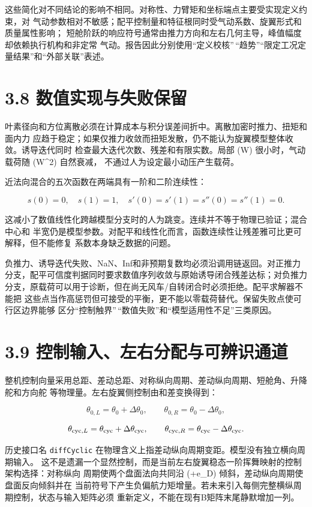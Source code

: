 \documentclass[UTF8,11pt,oneside,openany,fontset=windows]{ctexbook}
\begin{document}
这些简化对不同结论的影响不相同。对称性、力臂矩和坐标端点主要受实现定义约束，对
气动参数相对不敏感；配平控制量和特征根同时受气动系数、旋翼形式和质量属性影响；
短舱阶跃的响应符号通常由推力方向和左右几何主导，峰值幅度却依赖执行机构和非定常
气动。报告因此分别使用``定义校核''\,``趋势''``限定工况定量结果''和``外部关联''表述。

\section{3.8
数值实现与失败保留}\label{ux6570ux503cux5b9eux73b0ux4e0eux5931ux8d25ux4fddux7559}

叶素径向和方位离散必须在计算成本与积分误差间折中。离散加密时推力、扭矩和面内力
应趋于稳定；如果仅推力收敛而扭矩发散，仍不能认为旋翼模型整体收敛。诱导迭代同时
检查最大迭代次数、残差和有限实数。局部 (W) 很小时，气动载荷随 (W\^{}2)
自然衰减， 不通过人为设定最小动压产生载荷。

近法向混合的五次函数在两端具有一阶和二阶连续性：

\[
s(0)=0,\quad s(1)=1,\quad s'(0)=s'(1)=s''(0)=s''(1)=0.
\]

这减小了数值线性化跨越模型分支时的人为跳变。连续并不等于物理已验证；混合中心和
半宽仍是模型参数。对配平和线性化而言，函数连续性让残差雅可比更可解释，但不能修复
系数本身缺乏数据的问题。

负推力、诱导迭代失败、NaN、Inf和非预期复数均必须沿调用链返回。对正推力分支，配平可信度判据同时要求数值序列收敛与原始诱导闭合残差达标；对负推力分支，原载荷可以用于诊断，但在尚无风车/自转闭合时必须拒绝。配平求解器不能把
这些点当作高惩罚但可接受的平衡，更不能以零载荷替代。保留失败点使可行区边界能够
区分``控制触界''\,``数值失败''和``模型适用性不足''三类原因。

\section{3.9
控制输入、左右分配与可辨识通道}\label{ux63a7ux5236ux8f93ux5165ux5de6ux53f3ux5206ux914dux4e0eux53efux8fa8ux8bc6ux901aux9053}

整机控制向量采用总距、差动总距、对称纵向周期、差动纵向周期、短舱角、升降舵和方向舵
等物理量。左右旋翼侧控制由和差变换得到：

\[
\theta_{0,L}=\theta_0+\Delta\theta_0,\qquad
\theta_{0,R}=\theta_0-\Delta\theta_0,
\]

\[
\theta_{{\rm cyc},L}=\theta_{\rm cyc}+\Delta\theta_{\rm cyc},\qquad
\theta_{{\rm cyc},R}=\theta_{\rm cyc}-\Delta\theta_{\rm cyc}.
\]

历史接口名 \texttt{diffCyclic}
在物理含义上指差动纵向周期变距。模型没有独立横向周期输入。
这不是遗漏一个显然控制，而是当前左右旋翼稳态一阶挥舞映射的控制架构选择：对称纵向
周期使两个盘面法向共同沿 (+\mathbf e\_D)
倾斜，差动纵向周期使盘面反向倾斜并在
当前符号下产生负偏航力矩增量。若未来引入每侧完整横纵周期控制，状态与输入矩阵必须
重新定义，不能在现有B矩阵末尾静默增加一列。
\end{document}
